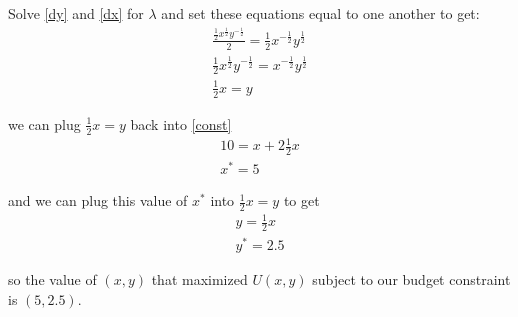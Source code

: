 \documentclass{article}
\begin{document}
Solve \ref{dy} and \ref{dx} for $\lambda$ and set these equations equal to one another to get: 
\begin{align*}
    \frac{\frac{1}{2} x^\frac{1}{2} y^{-\frac{1}{2}}}{2} = \frac{1}{2} x^{-\frac{1}{2}} y^{\frac{1}{2}} \\
    \frac{1}{2} x^\frac{1}{2} y^{-\frac{1}{2}} = x^{-\frac{1}{2}} y^{\frac{1}{2}}\\
    \frac{1}{2} x = y 
\end{align*}

we can plug $\frac{1}{2} x = y $ back into \ref{const}
\begin{align*}
    10 = x + 2 \frac{1}{2} x\\
    x^* = 5 
\end{align*}

and we can plug this value of $x^*$ into $\frac{1}{2} x = y $ to get 
\begin{align*}
    y = \frac{1}{2}x\\
    y^* = 2.5
\end{align*}

so the value of $(x,y)$ that maximized $U(x,y)$ subject to our budget constraint is $(5, 2.5)$. 
\end{document}
